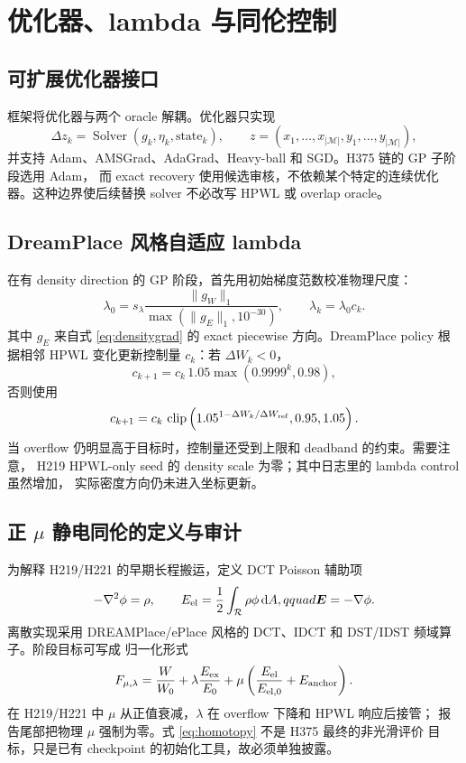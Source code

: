 \documentclass[UTF8,a4paper,11pt]{ctexrep}
\newcommand{\clip}{\operatorname{clip}}
\newcommand{\R}{\mathcal{R}}
\newcommand{\M}{\mathcal{M}}
\newcommand{\dd}{\mathrm{d}}
\begin{document}
\chapter{优化器、lambda 与同伦控制}

\section{可扩展优化器接口}
框架将优化器与两个 oracle 解耦。优化器只实现
\[
 \Delta z_k=\operatorname{Solver}(g_k,\eta_k,\text{state}_k),
 \qquad z=(x_1,\ldots,x_{|\M|},y_1,\ldots,y_{|\M|}),
\]
并支持 Adam、AMSGrad、AdaGrad、Heavy-ball 和 SGD。H375 链的 GP 子阶段选用 Adam，
而 exact recovery 使用候选审核，不依赖某个特定的连续优化器。这种边界使后续替换
solver 不必改写 HPWL 或 overlap oracle。

\section{DreamPlace 风格自适应 lambda}
在有 density direction 的 GP 阶段，首先用初始梯度范数校准物理尺度：
\begin{equation}
 \lambda_0=s_\lambda
 \frac{\|g_W\|_1}{\max(\|g_E\|_1,10^{-30})},
 \qquad
 \lambda_k=\lambda_0c_k.
 \label{eq:lambda0}
\end{equation}
其中 $g_E$ 来自式 \eqref{eq:densitygrad} 的 exact piecewise 方向。DreamPlace policy
根据相邻 HPWL 变化更新控制量 $c_k$：若 $\Delta W_k<0$，
\begin{equation}
 c_{k+1}=c_k\,1.05\max(0.9999^k,0.98),
 \label{eq:lambdadec}
\end{equation}
否则使用
\begin{equation}
 c_{k+1}=c_k\,\clip\left(
 1.05^{1-\Delta W_k/\Delta W_{\rm ref}},0.95,1.05\right).
 \label{eq:lambdainc}
\end{equation}
当 overflow 仍明显高于目标时，控制量还受到上限和 deadband 的约束。需要注意，
H219 HPWL-only seed 的 density scale 为零；其中日志里的 lambda control 虽然增加，
实际密度方向仍未进入坐标更新。

\section{\texorpdfstring{正 $\mu$ 静电同伦的定义与审计}{正 mu 静电同伦的定义与审计}}
为解释 H219/H221 的早期长程搬运，定义 DCT Poisson 辅助项
\begin{equation}
 -\nabla^2\phi=\rho,\qquad
 E_{\rm el}=\frac12\int_{\R}\rho\phi\,\dd A,qquad
 \bm{E}=-\nabla\phi.
 \label{eq:electro}
\end{equation}
离散实现采用 DREAMPlace/ePlace 风格的 DCT、IDCT 和 DST/IDST 频域算子。阶段目标可写成
归一化形式
\begin{equation}
 F_{\mu,\lambda}=
 \frac{W}{W_0}
 +\lambda\frac{E_{\rm ex}}{E_0}
 +\mu\left(\frac{E_{\rm el}}{E_{{\rm el},0}}+E_{\rm anchor}\right).
 \label{eq:homotopy}
\end{equation}
在 H219/H221 中 $\mu$ 从正值衰减，$\lambda$ 在 overflow 下降和 HPWL 响应后接管；
报告尾部把物理 $\mu$ 强制为零。式 \eqref{eq:homotopy} 不是 H375 最终的非光滑评价
目标，只是已有 checkpoint 的初始化工具，故必须单独披露。
\end{document}
